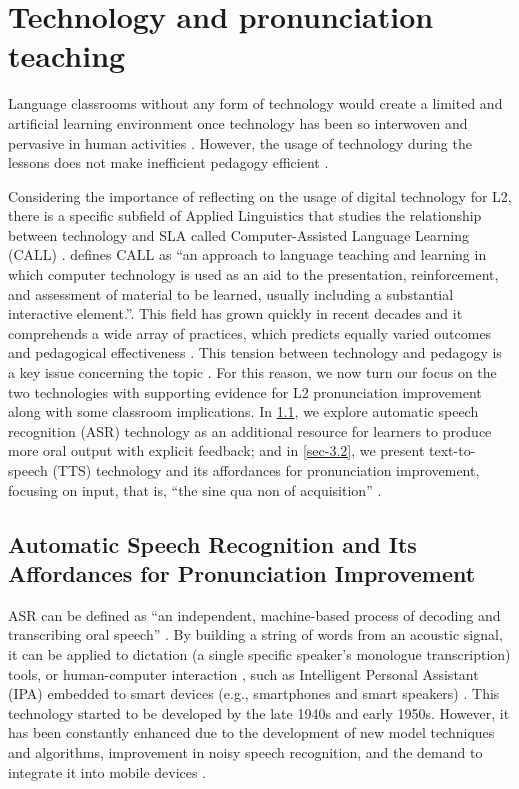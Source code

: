 \documentclass[english]{textolivre}
\begin{document}
\section{Technology and pronunciation teaching}\label{sec-3}
Language classrooms without any form of technology would create a limited and artificial learning environment once technology has been so interwoven and pervasive in human activities \cite{chun2016}. However, the usage of technology during the lessons does not make inefficient pedagogy efficient \cite{golonka2014}.

Considering the importance of reflecting on the usage of digital technology for L2, there is a specific subfield of Applied Linguistics that studies the relationship between technology and SLA called Computer-Assisted Language Learning (CALL) \cite{martins2012}. \textcite[p. 261]{davies2006} defines CALL as “an approach to language teaching and learning in which computer technology is used as an aid to the presentation, reinforcement, and assessment of material to be learned, usually including a substantial interactive element.”. This field has grown quickly in recent decades \cite{pennington2019} and it comprehends a wide array of practices, which predicts equally varied outcomes and pedagogical effectiveness \cite{chapelle2013}. This tension between technology and pedagogy is a key issue concerning the topic \cite{rogerson-revell2021}. For this reason, we now turn our focus on the two technologies with supporting evidence for L2 pronunciation improvement along with some classroom implications. In \cref{sec-3.1}, we explore automatic speech recognition (ASR) technology as an additional resource for learners to produce more oral output with explicit feedback; and in \cref{sec-3.2}, we present text-to-speech (TTS) technology and its affordances for pronunciation improvement, focusing on input, that is, “the sine qua non of acquisition” \cite[p. 177]{grass2015}.

\subsection{Automatic Speech Recognition and Its Affordances for Pronunciation Improvement}\label{sec-3.1}
ASR can be defined as “an independent, machine-based process of decoding and transcribing oral speech” \cite[p. 316]{levis2013}. By building a string of words from an acoustic signal, it can be applied to dictation (a single specific speaker’s monologue transcription) tools, or human-computer interaction \cite{jurafsky2020}, such as Intelligent Personal Assistant (IPA) embedded to smart devices (e.g., smartphones and smart speakers) \cite{inceoglu2020, moussalli2020}. This technology started to be developed by the late 1940s and early 1950s. However, it has been constantly enhanced due to the development of new model techniques and algorithms, improvement in noisy speech recognition, and the demand to integrate it into mobile devices \cite{jurafsky2020, levis2013}.
\end{document}
